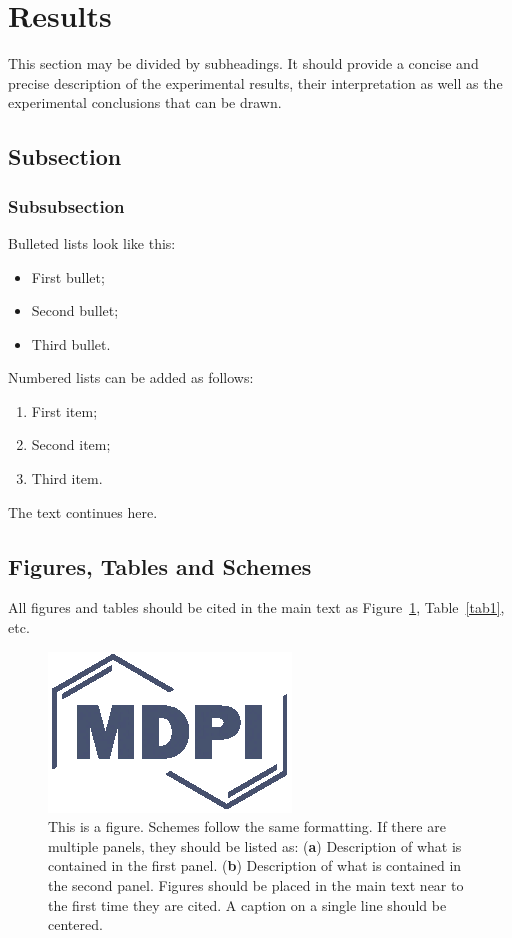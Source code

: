 \documentclass[journal,article,submit,pdftex,moreauthors]{Definitions/mdpi}
\begin{document}
\section{Results}

This section may be divided by subheadings. It should provide a concise and precise description of the experimental results, their interpretation as well as the experimental conclusions that can be drawn.
\subsection{Subsection}
\subsubsection{Subsubsection}

Bulleted lists look like this:
\begin{itemize}
\item	First bullet;
\item	Second bullet;
\item	Third bullet.
\end{itemize}

Numbered lists can be added as follows:
\begin{enumerate}
\item	First item; 
\item	Second item;
\item	Third item.
\end{enumerate}

The text continues here. 

\subsection{Figures, Tables and Schemes}

All figures and tables should be cited in the main text as Figure~\ref{fig1}, Table~\ref{tab1}, etc.

\begin{figure}[H]
\includegraphics[width=10.5 cm]{Definitions/logo-mdpi}
\caption{This is a figure. Schemes follow the same formatting. If there are multiple panels, they should be listed as: (\textbf{a}) Description of what is contained in the first panel. (\textbf{b}) Description of what is contained in the second panel. Figures should be placed in the main text near to the first time they are cited. A caption on a single line should be centered.\label{fig1}}
\end{figure}   
\unskip
\end{document}

